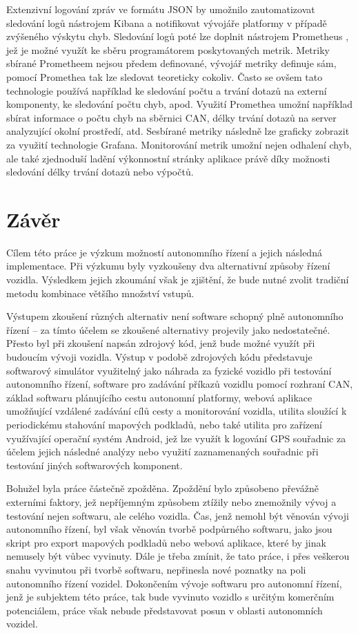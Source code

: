 \documentclass[czech, bachelor]{diploma}
\begin{document}
Extenzivní logování zpráv ve formátu JSON by umožnilo zautomatizovat sledování logů nástrojem Kibana \cite{elk-source} a
notifikovat vývojáře platformy v případě zvýšeného výskytu chyb. Sledování logů poté lze doplnit nástrojem Prometheus \cite{
prometheus-source}, jež je možné využít ke sběru programátorem poskytovaných metrik. Metriky sbírané Prometheem nejsou předem
definované, vývojář metriky definuje sám, pomocí Promethea tak lze sledovat teoreticky cokoliv. Často se ovšem tato technologie
používá například ke sledování počtu a trvání dotazů na externí komponenty, ke sledování počtu chyb, apod. Využití Promethea
umožní například sbírat informace o počtu chyb na sběrnici CAN, délky trvání dotazů na server analyzující okolní prostředí, atd.
Sesbírané metriky následně lze graficky zobrazit za využití technologie Grafana. Monitorování metrik umožní nejen odhalení chyb,
ale také zjednoduší ladění výkonnostní stránky aplikace právě díky možnosti sledování délky trvání dotazů nebo výpočtů.

\chapter{Závěr}

Cílem této práce je výzkum možností autonomního řízení a jejich následná implementace. Při výzkumu byly vyzkoušeny dva
alternativní způsoby řízení vozidla. Výsledkem jejich zkoumání však je zjištění, že bude nutné zvolit tradiční metodu kombinace
většího množství vstupů.

Výstupem zkoušení různých alternativ není software schopný plně autonomního řízení -- za tímto účelem se zkoušené alternativy
projevily jako nedostatečné. Přesto byl při zkoušení napsán zdrojový kód, jenž bude možné využít při budoucím vývoji vozidla.
Výstup v podobě zdrojových kódu představuje softwarový simulátor využitelný jako náhrada za fyzické vozidlo při testování
autonomního řízení, software pro zadávání příkazů vozidlu pomocí rozhraní CAN, základ softwaru plánujícího cestu autonomní
platformy, webová aplikace umožňující vzdálené zadávání cílů cesty a monitorování vozidla, utilita sloužící k periodickému
stahování mapových podkladů, nebo také utilita pro zařízení využívající operační systém Android, jež lze využít k logování GPS
souřadnic za účelem jejich následné analýzy nebo využití zaznamenaných souřadnic při testování jiných softwarových komponent.

Bohužel byla práce částečně zpožděna. Zpoždění bylo způsobeno převážně externími faktory, jež nepříjemným způsobem ztížily nebo
znemožnily vývoj a testování nejen softwaru, ale celého vozidla. Čas, jenž nemohl být věnován vývoji autonomního řízení, byl však
věnován tvorbě podpůrného softwaru, jako jsou skript pro export mapových podkladů nebo webová aplikace, které by jinak nemusely
být vůbec vyvinuty. Dále je třeba zmínit, že tato práce, i přes veškerou snahu vyvinutou při tvorbě softwaru, nepřinesla nové
poznatky na poli autonomního řízení vozidel. Dokončením vývoje softwaru pro autonomní řízení, jenž je subjektem této práce, tak
bude vyvinuto vozidlo s určitým komerčním potenciálem, práce však nebude představovat posun v oblasti autonomních vozidel.
\end{document}

